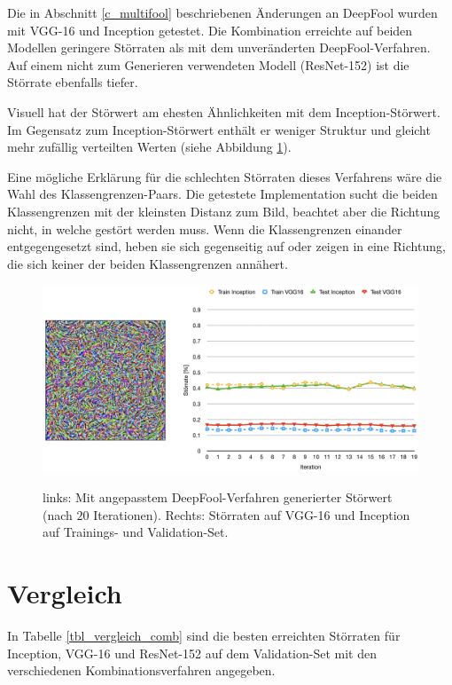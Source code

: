 \documentclass{FFHS_Thesis_Additions/ffhsthesis}
\begin{document}
Die in Abschnitt \ref{c_multifool} beschriebenen Änderungen an DeepFool wurden mit VGG-16 und Inception getestet. Die Kombination erreichte auf beiden Modellen geringere Störraten als mit dem unveränderten DeepFool-Verfahren. Auf einem nicht zum Generieren verwendeten Modell (ResNet-152) ist die Störrate ebenfalls tiefer.

Visuell hat der Störwert am ehesten Ähnlichkeiten mit dem Inception-Störwert. Im Gegensatz zum Inception-Störwert enthält er weniger Struktur und gleicht mehr zufällig verteilten Werten (siehe Abbildung \ref{fig_stoerwerte_multifool}). 

Eine mögliche Erklärung für die schlechten Störraten dieses Verfahrens wäre die Wahl des Klassengrenzen-Paars. Die getestete Implementation sucht die beiden Klassengrenzen mit der kleinsten Distanz zum Bild, beachtet aber die Richtung nicht, in welche gestört werden muss. Wenn die Klassengrenzen einander entgegengesetzt sind, heben sie sich gegenseitig auf oder zeigen in eine Richtung, die sich keiner der beiden Klassengrenzen annähert.



\begin{figure}[h]
\caption{links: Mit angepasstem DeepFool-Verfahren generierter Störwert (nach $20$ Iterationen). Rechts: Störraten auf VGG-16 und Inception auf Trainings- und Validation-Set.}
\centering
\includegraphics[width=\textwidth]{./images/stoerrate_multifool}
\label{fig_stoerwerte_multifool}
\end{figure}

\section{Vergleich}

In Tabelle \ref{tbl_vergleich_comb} sind die besten erreichten Störraten für Inception, VGG-16 und ResNet-152 auf dem Validation-Set mit den verschiedenen Kombinationsverfahren angegeben. 
\end{document}
